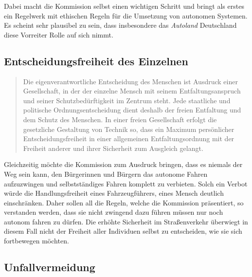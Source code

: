 \documentclass[twoside,a4paper,12pt]{article}
\begin{document}
Dabei macht die Kommission selbst einen wichtigen Schritt und bringt als erstes ein Regelwerk mit ethischen Regeln für die Umsetzung von autonomen Systemen. Es scheint sehr plausibel zu sein, dass insbesondere das \textit{Autoland} Deutschland diese Vorreiter Rolle auf sich nimmt. 

\subsection{Entscheidungsfreiheit des Einzelnen} \label{EntscheidungsfreiheitDesEinzelnen}

\begin{quote}
\glqq
Die eigenverantwortliche Entscheidung des Menschen ist Ausdruck einer Gesellschaft, in
der der einzelne Mensch mit seinem Entfaltungsanspruch und seiner Schutzbedürftigkeit
im Zentrum steht. Jede staatliche und politische Ordnungsentscheidung dient deshalb
der freien Entfaltung und dem Schutz des Menschen. In einer freien Gesellschaft erfolgt
die gesetzliche Gestaltung von Technik so, dass ein Maximum persönlicher Entscheidungsfreiheit in einer allgemeinen 
Entfaltungsordnung mit der Freiheit anderer und ihrer
Sicherheit zum Ausgleich gelangt.\grqq\mbox{~\cite[S. 10]{ek}}
\end{quote}
Gleichzeitig möchte die Kommission zum Ausdruck bringen, dass es niemals der Weg sein kann, den Bürgerinnen und Bürgern das autonome Fahren aufzuzwingen und 
 selbstständiges Fahren komplett zu verbieten. Solch ein Verbot würde die Handlungsfreiheit eines Fahrzeugführers, eines Mensch deutlich einschränken.
 Daher sollen all die Regeln, welche die Kommission präsentiert, so verstanden werden, dass sie nicht zwingend dazu führen müssen nur noch autonom fahren zu dürfen.
 Die erhöhte Sicherheit im Straßenverkehr überwiegt in diesem Fall nicht der Freiheit aller Individuen selbst zu entscheiden, wie sie sich fortbewegen möchten.

\subsection{Unfallvermeidung} \label{Unfallvermeidung}
\end{document}
